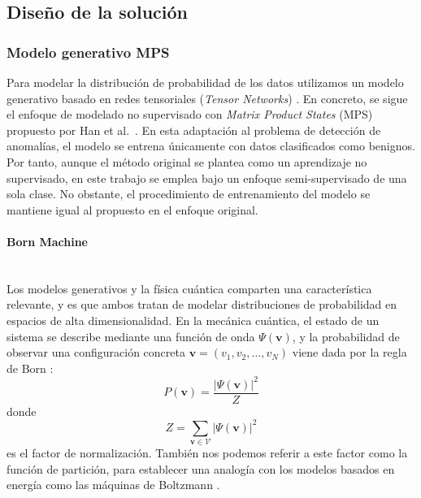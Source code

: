\documentclass[12pt]{extarticle}
\numberwithin{equation}{section}
\begin{document}
\begin{refsection}
\subsection{Diseño de la soluci\'on}

\subsubsection{Modelo generativo MPS}
\label{subsubsec:enfoquepropuesto}

Para modelar la distribución de probabilidad de los datos utilizamos un modelo generativo basado en redes tensoriales (\textit{Tensor Networks}) \cite{orus2014practical}. En concreto, se sigue el enfoque de modelado no supervisado con \textit{Matrix Product States} (MPS) propuesto por Han et al.\ \cite{han2018unsupervised}. En esta adaptación al problema de detección de anomalías, el modelo se entrena únicamente con datos clasificados como benignos. Por tanto, aunque el método original se plantea como un aprendizaje no supervisado, en este trabajo se emplea bajo un enfoque semi-supervisado de una sola clase. No obstante, el procedimiento de entrenamiento del modelo se mantiene igual al propuesto en el enfoque original.

\paragraph{Born Machine}
\label{par:bornmachine}
\mbox{}\\

Los modelos generativos y la física cuántica comparten una característica relevante, y es que ambos tratan de modelar distribuciones de probabilidad en espacios de alta dimensionalidad. En la mecánica cuántica, el estado de un sistema se describe mediante una función de onda $\Psi(\mathbf{v})$, y la probabilidad de observar una configuración concreta $\mathbf{v} = (v_1, v_2, \ldots, v_N)$ viene dada por la regla de Born \cite{born1926}:
\begin{equation}
P(\mathbf{v}) = \frac{|\Psi(\mathbf{v})|^2}{Z}
\label{eq:reglaborn}
\end{equation}
donde
\begin{equation}
Z = \sum_{\mathbf{v} \in \mathcal{V}} |\Psi(\mathbf{v})|^2
\label{eq:funcionparticion}
\end{equation}
es el factor de normalización. También nos podemos referir a este factor como la función de partición, para establecer una analogía con los modelos basados en energía como las máquinas de Boltzmann \cite{ackley1985boltzmann}.


\end{refsection}
\end{document}
